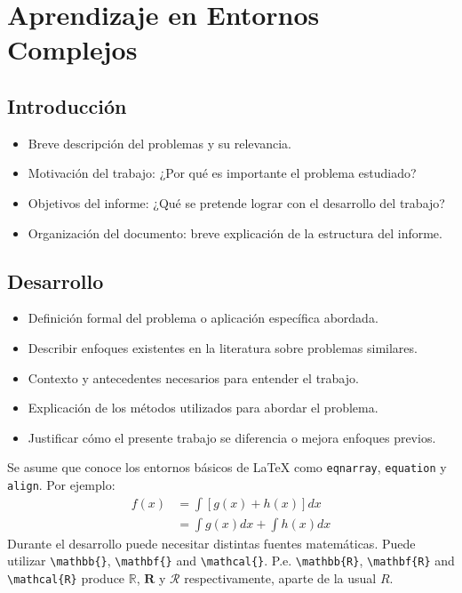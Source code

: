 
\chapter{Aprendizaje en Entornos Complejos}

\section{Introducción }

	\begin{itemize}
        \item Breve descripción del problemas y su relevancia.
        \item Motivación del trabajo: ¿Por qué es importante el problema estudiado?
        \item Objetivos del informe: ¿Qué se pretende lograr con el desarrollo del trabajo?
        \item Organización del documento: breve explicación de la estructura del informe.
    \end{itemize}

\section{Desarrollo}
	\begin{itemize}
        \item Definición formal del problema o aplicación específica abordada.
        \item Describir enfoques existentes en la literatura sobre problemas similares.
        \item Contexto y antecedentes necesarios para entender el trabajo.
        \item Explicación de los métodos utilizados para abordar el problema.
        \item Justificar cómo el presente trabajo se diferencia o mejora enfoques previos.
    \end{itemize}

Se asume que conoce los entornos básicos de \LaTeX\/ como \texttt{eqnarray}, \texttt{equation} y 
\texttt{align}. Por ejemplo:
\begin{align}
f(x) &= \int  [ g(x) +  h(x) ] dx  \nonumber \\
	 &= \int  g(x)dx + \int  h(x)  dx 
\end{align}
Durante el desarrollo puede necesitar distintas fuentes matemáticas. 
Puede utilizar \verb+\mathbb{}+, \verb+\mathbf{}+ and
\verb+\mathcal{}+. P.e.  \verb+\mathbb{R}+, \verb+\mathbf{R}+
and \verb+\mathcal{R}+ produce $\mathbb{R}$, $\mathbf{R}$ y $\mathcal{R}$
respectivamente, aparte de la usual $R$.

